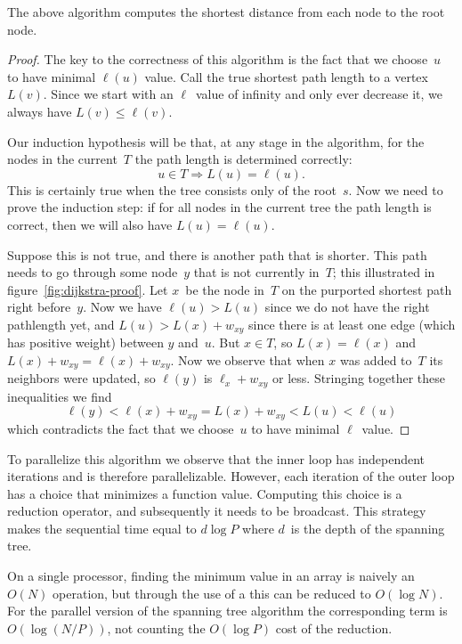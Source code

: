 \begin{theorem}
  The above algorithm computes the shortest distance from each
  node to the root node.
\end{theorem}
\begin{proof}
  The key to the correctness of this algorithm is the fact that
  we choose~$u$ to have minimal $\ell(u)$ value. Call the true shortest path
  length to a vertex~$L(v)$. Since we start with an $\ell$~value of infinity and
  only ever decrease it, we always have $L(v)\leq\ell(v)$.

  Our induction hypothesis will be that, at any stage in the algorithm,
  for the nodes in the current~$T$ the path length is determined correctly:
  \[ u\in T\Rightarrow L(u)=\ell(u). \]
  This is certainly true when the tree consists only of the root~$s$.
  Now we need to prove the induction step: if for all nodes in the
  current tree the path length is correct, then we will also 
  have $L(u)=\ell(u)$. 

  Suppose this is not true, and there is another path that is shorter.
  This path needs to go through some node~$y$ that is not currently in~$T$;
  this illustrated in figure~\ref{fig:dijkstra-proof}.
  Let $x$~be the node in~$T$ on the purported shortest path right before~$y$.
  Now we have $\ell(u)>L(u)$ since we do not have the right pathlength
  yet, and $L(u)>L(x)+w_{xy}$ since there is at least one edge (which has 
  positive weight) between $y$ and~$u$. But $x\in T$, so $L(x)=\ell(x)$
  and $L(x)+w_{xy}=\ell(x)+w_{xy}$. Now we observe that when $x$ was
  added to~$T$ its neighbors were updated, so $\ell(y)$ is $\ell_x+w_{xy}$ or less.
  Stringing together these inequalities we find 
  \[ \ell(y)<\ell(x)+w_{xy}=L(x)+w_{xy}<L(u)<\ell(u) \]
  which contradicts the fact that we choose~$u$ to have minimal $\ell$~value.
\end{proof}

To parallelize this algorithm we observe that the inner loop has
independent iterations and is therefore parallelizable.
However, each iteration of the outer loop
has a choice that minimizes a function value. Computing this
choice is a reduction operator, and subsequently it needs to be broadcast.
This strategy makes the sequential time equal to $d\log P$ where $d$~is
the depth of the spanning tree.

On a single processor, finding the minimum value in an array is
naively an $O(N)$ operation, but through the use of a 
this can be reduced to $O(\log N)$. For the parallel version of the spanning tree
algorithm the corresponding term is~$O(\log (N/P))$, not counting the $O(\log P)$
cost of the reduction.

